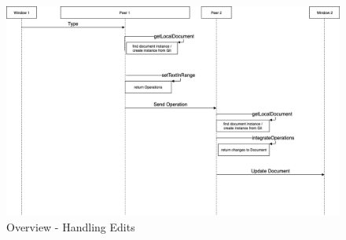 \begin{figure}
    \centering
    \includegraphics[width=1\linewidth]{figures/illustrations/handle-change.png}
	\caption{Overview - Handling Edits}
    \label{fig:change_handling}
\end{figure}
